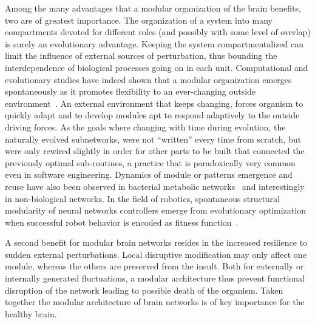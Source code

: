 Among the many advantages that a modular organization of the brain benefits, two are of greatest importance. The organization of a system into many compartments devoted for different roles (and possibly with some level of overlap) is surely an evolutionary advantage. 
Keeping the system compartmentalized can limit the influence of external sources of perturbation, thus bounding the interdependence of biological processes going on in each unit. Computational and evolutionary studies have indeed shown that a modular organization emerges spontaneously as it promotes flexibility to an ever-changing outside environment~\cite{kashtan2005,kashtan2007}. 
An external environment that keeps changing, forces organism to quickly adapt and to develop modules apt to respond adaptively to the outside driving forces.
As the goals where changing with time during evolution, the naturally evolved subnetworks, were not ``written'' every time from scratch, but were only rewired slightly in order for other parts to be built that connected the previously optimal sub-routines, a practice that is paradoxically very common even in software engineering. 
Dynamics of module or patterns emergence and reuse have also been observed in bacterial metabolic networks~\cite{kreimer2008} and interestingly in non-biological networks. In the field of robotics, spontaneous structural modularity of neural networks controllers emerge from evolutionary optimization when successful robot behavior is encoded as fitness function~\cite{bongard2011}.

A second benefit for modular brain networks resides in the increased resilience to sudden external perturbations. Local disruptive modification may only affect one module, whereas the others are preserved from the insult. Both for externally or internally generated fluctuations, a modular architecture thus prevent functional disruption of the network leading to possible death of the organism. Taken together the modular architecture of brain networks is of key importance for the healthy brain.


